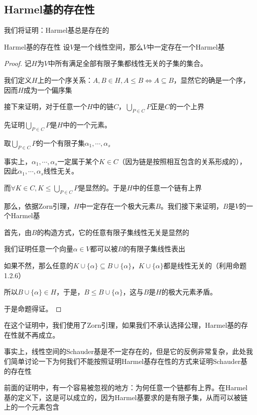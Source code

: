 \documentclass[12pt, a4paper, oneside, UTF8]{ctexbook}
\begin{document}
		\subsection{Harmel基的存在性}
			我们将证明：Harmel基总是存在的
			\begin{them}{Harmel基的存在性}{}
				设$V$是一个线性空间，那么$V$中一定存在一个Harmel基
			\end{them}
			\begin{proof}
				记$H$为$V$中所有满足全部有限子集都线性无关的子集的集合。

				我们定义$H$上的一个序关系：$A,B \in H,A \leqslant B \Leftrightarrow A \subseteq B$，显然它的确是一个序，因而$H$成为一个偏序集

				接下来证明，对于任意一个$H$中的链$C$，$\bigcup\limits_{P \in C} P$正是$C$的一个上界

				先证明$\bigcup\limits_{P \in C} P$是$H$中的一个元素。

				取$\bigcup\limits_{P \in C} P$的一个有限子集$\alpha_1,\cdots,\alpha_s$

				事实上，$\alpha_1,\cdots,\alpha_s$一定属于某个$K \in C$（因为链是按照相互包含的关系形成的），因此$\alpha_1,\cdots,\alpha_s$线性无关。

				而$\forall K \in C,K \leqslant \bigcup_{P\in C} P$是显然的。于是$H$中的任意一个链有上界

				那么，依据Zorn引理，$H$中一定存在一个极大元素$B$。我们接下来证明，$B$是$V$的一个Harmel基
				
				首先，由$B$的构造方式，它的任意有限子集线性无关是显然的

				我们证明任意一个向量$\alpha \in V$都可以被$B$的有限子集线性表出

				如果不然，那么任意的$K \cup \{\alpha \} \subseteq B\cup \{\alpha \}$，$K\cup \{\alpha \}$都是线性无关的（利用命题1.2.6）
				
				所以$B \cup \{\alpha \} \in H$，于是，$B \leqslant B\cup \{\alpha \}$，这与$B$是$H$的极大元素矛盾。

				于是命题得证。
			\end{proof}
			在这个证明中，我们使用了Zorn引理，如果我们不承认选择公理，Harmel基的存在性就不再成立。

			事实上，线性空间的Schauder基是不一定存在的，但是它的反例非常复杂，此处我们简单讨论一下为何我们不能按照证明Harmel基存在性的方式来证明Schauder基的存在性

			前面的证明中，有一个容易被忽视的地方：为何任意一个链都有上界。在Harmel基的定义下，这是可以成立的，因为Harmel基要求的是有限子集，从而可以被链上的一个元素包含
\end{document}
